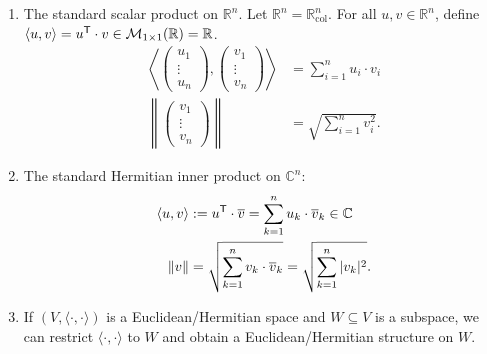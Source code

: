 \begin{enumerate}[label=\textbf{(\alph*)}]
    \item The standard scalar product on $\mathbb{R}^n$. Let $\mathbb{R}^n = \mathbb{R}^n_{\text{col}}$. For all $u, v \in \mathbb{R}^n$, define $\langle u, v \rangle = u^{\mathsf{T}} \cdot v \in \mathcal{M}_{1 \times 1}(\mathbb{R}) = \mathbb{R}$.
    \begin{align*}
        \left\langle \begin{pmatrix} u_1 \\ \vdots \\ u_n \end{pmatrix}, \begin{pmatrix} v_1 \\ \vdots \\ v_n \end{pmatrix} \right\rangle &= \sum_{i=1}^n u_i \cdot v_i \\
        \left\| \begin{pmatrix} v_1 \\ \vdots \\ v_n \end{pmatrix} \right\| &= \sqrt{\sum_{i=1}^n v_i^2}.
    \end{align*}
    
    \item The standard Hermitian inner product on $\mathbb{C}^n$:
    \begin{align*}
        \langle u, v \rangle &:= u^{\mathsf{T}} \cdot \overline{v} = \sum_{k=1}^n u_k \cdot \overline{v}_k \in \mathbb{C} \\
        \|v\| &= \sqrt{\sum_{k=1}^n v_k \cdot \overline{v}_k} = \sqrt{\sum_{k=1}^n |v_k|^2}.
    \end{align*}

    \item If $(V, \langle \cdot, \cdot \rangle)$ is a Euclidean/Hermitian space and $W \subseteq V$ is a subspace, we can restrict $\langle \cdot, \cdot \rangle$ to $W$ and obtain a Euclidean/Hermitian structure on $W$.
\end{enumerate}

